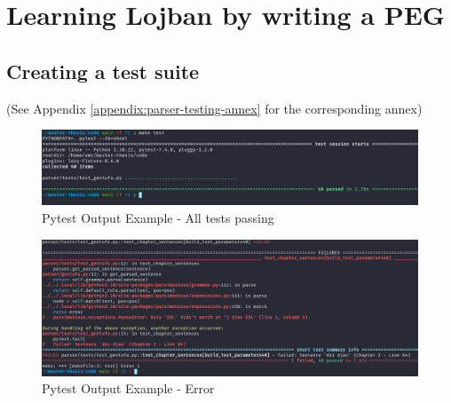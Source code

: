 \chapter{Learning Lojban by writing a PEG}

\section{Creating a test suite}
\label{sub:creating_a_test_suite}

(See Appendix \ref{appendix:parser-testing-annex} for the corresponding annex)

\begin{figure}[H]
\hspace{-1.1cm}
\includegraphics[scale=0.43]{images/pytest_output_pass.png}
\caption{Pytest Output Example - All tests passing}
\end{figure}

\begin{figure}[H]
\hspace{-2.2cm}
\includegraphics[scale=0.43]{images/pytest_output_fail.png}
\caption{Pytest Output Example - Error}
\end{figure}